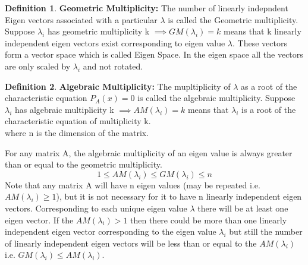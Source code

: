 \documentclass[12pt, oneside]{book}
\theoremstyle{definition}
\newtheorem{definition}{Definition}[section]
\theoremstyle{definition}
\theoremstyle{remark}
\begin{document}
\begin{definition}
\textbf{Geometric Multiplicity: }
The number of linearly indepndent Eigen vectors associated with a particular $\lambda$ is called
the Geometric multiplicity. Suppose
$\lambda_i$ has geometric multiplicity k $\implies GM(\lambda_i)=k$ means that k linearly independent eigen vectors exist corresponding 
to eigen value $\lambda$. These vectors form a vector space which is called Eigen Space. In the eigen space all the vectors are only scaled by $\lambda_i$ and not rotated.
\end{definition}
\begin{definition} \textbf{Algebraic Multiplicity: }
The mupltiplicity of $\lambda$ as a root of the characteristic equation $P_A(x)=0$ is called the algebraic multiplicity. Suppose $\lambda_i$ has algebraic multiplicity k $\implies AM(\lambda_i)=k$ means that $\lambda_i$ is a root of the characteristic equation of multiplicity k.\\
where n is the dimension of the matrix.
\end{definition}
For any matrix A, the algebraic multiplicity of an eigen value is always greater than or equal to the geometric multiplicity.\\
\[1 \leq AM(\lambda_i) \leq GM(\lambda_i) \leq n\]
Note that any matrix A will have n eigen values (may be repeated i.e. $AM(\lambda_i) \geq 1$), but it is not necessary for it to have n linearly independent eigen vectors. 
Corresponding to each unique eigen value $\lambda$ there will be at least one eigen vector. If the $AM(\lambda_i)>1$ then 
there could be more than one linearly independent eigen vector corresponding to the eigen value $\lambda_i$ but still the number of linearly independent eigen vectors
will be less than or equal to the $AM(\lambda_i)$ i.e. $GM(\lambda_i)\leq AM(\lambda_i)$.\\ 
\end{document}
